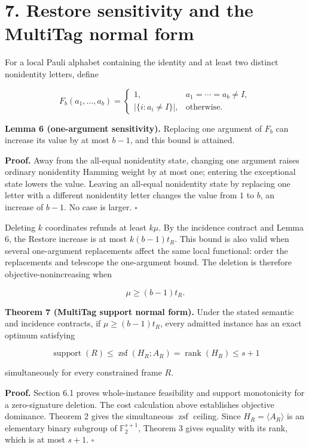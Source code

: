 \documentclass[11pt]{article}
\begin{document}
\section*{7. Restore sensitivity and the MultiTag normal form}\label{restore-sensitivity-and-the-multitag-normal-form}

For a local Pauli alphabet containing the identity and at least two distinct nonidentity letters, define

\[
F_b(a_1,\ldots,a_b)=
\begin{cases}
1, & a_1=\cdots=a_b\neq I,\\
|\{i:a_i\neq I\}|, & \text{otherwise}.
\end{cases}
\]

\textbf{Lemma 6 (one-argument sensitivity).} Replacing one argument of \(F_b\) can increase its value by at most \(b-1\), and this bound is attained.

\textbf{Proof.} Away from the all-equal nonidentity state, changing one argument raises ordinary nonidentity Hamming weight by at most one; entering the exceptional state lowers the value. Leaving an all-equal nonidentity state by replacing one letter with a different nonidentity letter changes the value from \(1\) to \(b\), an increase of \(b-1\). No case is larger. \(\square\)

Deleting \(k\) coordinates refunds at least \(k\mu\). By the incidence contract and Lemma 6, the Restore increase is at most \(k(b-1)t_R\). This bound is also valid when several one-argument replacements affect the same local functional: order the replacements and telescope the one-argument bound. The deletion is therefore objective-nonincreasing when

\[
\mu\geq (b-1)t_R.
\]

\textbf{Theorem 7 (MultiTag support normal form).} Under the stated semantic and incidence contracts, if \(\mu\geq (b-1)t_R\), every admitted instance has an exact optimum satisfying

\[
\operatorname{support}(R)
\leq
\operatorname{zsf}(H_R;A_R)
=
\operatorname{rank}(H_R)
\leq s+1
\]

simultaneously for every constrained frame \(R\).

\textbf{Proof.} Section 6.1 proves whole-instance feasibility and support monotonicity for a zero-signature deletion. The cost calculation above establishes objective dominance. Theorem 2 gives the simultaneous \(\operatorname{zsf}\) ceiling. Since \(H_R=\langle A_R\rangle\) is an elementary binary subgroup of \(\mathbb{F}_2^{s+1}\), Theorem 3 gives equality with its rank, which is at most \(s+1\). \(\square\)
\end{document}
